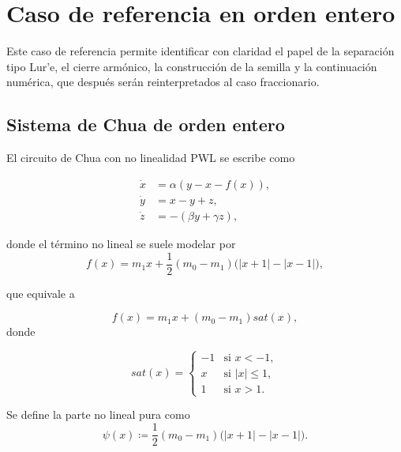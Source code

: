 \documentclass[journal]{IEEEtran}
\begin{document}
\section{Caso de referencia en orden entero}

Este caso de referencia permite identificar con claridad el papel de la separación tipo Lur'e, el cierre armónico, la construcción de la semilla y la continuación numérica, que después serán reinterpretados al caso fraccionario.

\subsection{Sistema de Chua de orden entero}
\noindent El circuito de Chua con no linealidad PWL se escribe como

\begin{equation}
    \label{eq:chua}
    \begin{aligned}
        \dot{x} &= \alpha \left( y - x - f(x) \right), \\
        \dot{y} &= x - y + z, \\
        \dot{z} &= -(\beta y + \gamma z),
    \end{aligned}
\end{equation}

\noindent donde el término no lineal se suele modelar por
\begin{equation*}
f(x)=m_1x+\frac{1}{2}(m_0-m_1)\big(|x+1|-|x-1|\big),
\end{equation*}

\noindent que equivale a

\begin{equation*}
    f(x) = m_1 x + (m_0-m_1)sat(x), 
\end{equation*}
donde 


\begin{equation}\label{eq:sat_chua}
    sat(x) = \begin{cases}
    -1 & \text{si } x < -1, \\
    x & \text{si } |x| \leq 1, \\
    1 & \text{si } x > 1.
\end{cases}
\end{equation}

\noindent Se define la parte no lineal pura como
\begin{equation}\label{eq:psi_chua_def}
  \psi(x) \coloneqq \frac{1}{2}(m_0-m_1)\big(|x+1|-|x-1|\big).
\end{equation}
\end{document}
